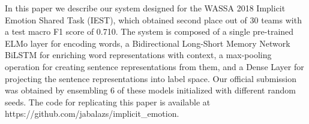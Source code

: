 In this paper we describe our system designed for the WASSA 2018 Implicit Emotion Shared Task (IEST), which obtained second place out of 30 teams with a test macro F1 score of 0.710. The system is composed of a single pre-trained ELMo layer for encoding words, a Bidirectional Long-Short Memory Network BiLSTM for enriching word representations with context, a max-pooling operation for creating sentence representations from them, and a Dense Layer for projecting the sentence representations into label space. Our official submission was obtained by ensembling 6 of these models initialized with different random seeds. The code for replicating this paper is available at https://github.com/jabalazs/implicit\_emotion.
